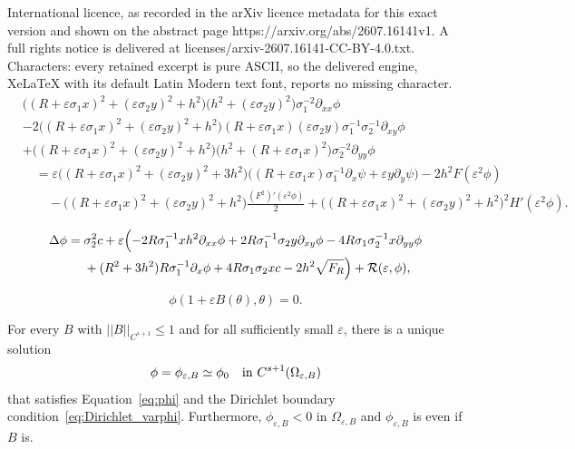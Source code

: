 \documentclass[10pt,a4paper]{amsart}
\begin{document}
International licence, as recorded in the arXiv licence metadata for this exact version and shown on the abstract page https://arxiv.org/abs/2607.16141v1. A full rights notice is delivered at licenses/arxiv-2607.16141-CC-BY-4.0.txt. Characters: every retained excerpt is pure ASCII, so the delivered engine, XeLaTeX with its default Latin Modern text font, reports no missing character.
\begin{equation}\label{eq:phi-0}
\begin{split}
&\bigl((R+\varepsilon\sigma_1x)^2+(\varepsilon\sigma_2y)^2+h^2\bigr)\bigl(h^2+(\varepsilon\sigma_2y)^2\bigr)
 \sigma_1^{-2}\partial_{xx}\phi \\
&-2\bigl((R+\varepsilon\sigma_1x)^2+(\varepsilon\sigma_2y)^2+h^2\bigr)(R+\varepsilon\sigma_1x)(\varepsilon\sigma_2y)
 \sigma_1^{-1}\sigma_2^{-1}\partial_{xy}\phi\\
&+\bigl((R+\varepsilon\sigma_1x)^2+(\varepsilon\sigma_2y)^2+h^2\bigr)\bigl(h^2+(R+\varepsilon\sigma_1x)^2\bigr)
 \sigma_2^{-2}\partial_{yy}\phi\\
&\quad=\varepsilon\bigl((R+\varepsilon\sigma_1x)^2+(\varepsilon\sigma_2y)^2+3h^2\bigr)\bigl((R+\varepsilon\sigma_1x) \sigma_1^{-1}\partial_{x}\psi+\varepsilon y\partial_{y}\psi\bigr)-2h^2F(\varepsilon^2\phi)\\
&\qquad-\bigl((R+\varepsilon\sigma_1x)^2+(\varepsilon\sigma_2y)^2+h^2\bigr) \frac{\left(F^2\right)'(\varepsilon^2\phi)}{2}+\bigl((R+\varepsilon\sigma_1x)^2+(\varepsilon\sigma_2y)^2+h^2\bigr)^2 H'(\varepsilon^2\phi).
\end{split}
\end{equation} 

\begin{equation}\label{eq:phi}
\begin{split}
\Delta\phi={}&\sigma_2^2c+\varepsilon\Bigl(-2R\sigma_1^{-1}xh^2\partial_{xx}\phi+2  R\sigma_1^{-1}\sigma_2y\partial_{xy}\phi-4R\sigma_1\sigma_2^{-1}x\partial_{yy}\phi\\
&
+(R^2+3h^2)R\sigma_1^{-1}\partial_x\phi 
+4R \sigma_1\sigma_2xc-2h^2\sqrt{F_R}\Bigr)
+\mathcal{R}(\varepsilon,\phi),
\end{split}
\end{equation}

\begin{equation}\label{eq:Dirichlet_varphi}
\phi(1+\varepsilon B(\theta),\theta) = 0 .
\end{equation}

\begin{proposition}\label{prop:Dirichlet}
	For every $B$ with $||B||_{C^{s+1}}\le1$ and for all sufficiently small $\varepsilon $, there is a unique solution
	\begin{equation*}%
	\phi=\phi_{\varepsilon,B}\simeq \phi_0\quad\hbox{in }C^{s+1}(\Omega_{\varepsilon,B}) 
	\end{equation*}
	that satisfies Equation~\eqref{eq:phi} and the Dirichlet boundary condition~\eqref{eq:Dirichlet_varphi}.
	Furthermore, $\phi_{\varepsilon,B}<0$ in $\varOmega_{\varepsilon, B}$ and $\phi_{\varepsilon,B}$ is even if $B$ is.
\end{proposition}
\end{document}
